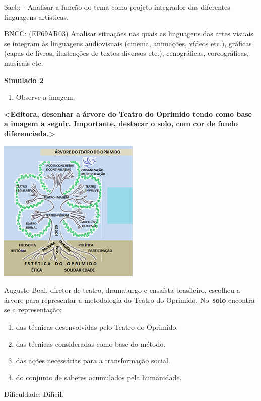 \begin{escolha}
{{{{{{{{Saeb: - Analisar a função do tema como projeto integrador das diferentes
linguagens artísticas.

BNCC: (EF69AR03) Analisar situações nas quais as linguagens das artes
visuais se integram às linguagens audiovisuais (cinema, animações,
vídeos etc.), gráficas (capas de livros, ilustrações de textos diversos
etc.), cenográficas, coreográficas, musicais etc.

\textbf{Simulado 2}

\begin{enumerate}
\def\labelenumi{\arabic{enumi}.}
\item
  Observe a imagem.
\end{enumerate}

\textbf{\textless{}Editora, desenhar a árvore do Teatro do Oprimido
tendo como base a imagem a seguir. Importante, destacar o solo, com cor
de fundo diferenciada.\textgreater{}}

\includegraphics[width=2.65625in,height=2.69792in]{media/image30.png}

Augusto Boal, diretor de teatro, dramaturgo e ensaísta brasileiro,
escolheu a árvore para representar a metodologia do Teatro do Oprimido.
No~\textbf{solo} encontra-se a representação:

\begin{enumerate}
\def\labelenumi{\alph{enumi})}
\item
  das técnicas desenvolvidas pelo Teatro do Oprimido.
\item
  das técnicas consideradas como base do método.
\item
  das ações necessárias para a transformação social.
\item
  do conjunto de saberes acumulados pela humanidade.
\end{enumerate}

Dificuldade: Difícil.

}}}}}}}}
\end{escolha}
